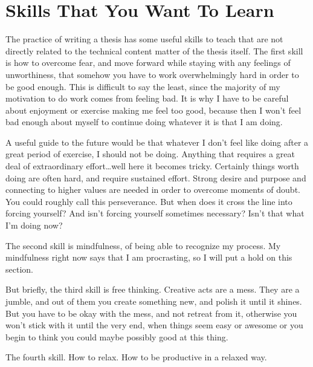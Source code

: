 \documentclass{article}
\begin{document}
\section{Skills That You Want To Learn}

The practice of writing a thesis has some useful skills to teach that are
not directly related to the technical content matter of the thesis itself.
The first skill is how to overcome fear, and move forward while staying
with any feelings of unworthiness, that somehow you have to work
overwhelmingly hard in order to be good enough. This is difficult to say
the least, since the majority of my motivation to do work comes from
feeling bad. It is why I have to be careful about enjoyment or exercise
making me feel too good, because then I won't feel bad enough about myself
to continue doing whatever it is that I am doing.

A useful guide to the future would be that whatever I don't feel like
doing after a great period of exercise, I should not be doing. Anything
that requires a great deal of extraordinary effort\ldots well here it
becomes tricky. Certainly things worth doing are often hard, and require
sustained effort. Strong desire and purpose and connecting to higher values
are needed in order to overcome moments of doubt. You could roughly
call this perseverance. But when does it cross
the line into forcing yourself? And isn't forcing yourself sometimes
necessary? Isn't that what I'm doing now?

The second skill is mindfulness, of being able to recognize my process.
My mindfulness right now says that I am procrasting, so I will put a
hold on this section.

But briefly, the third skill is free thinking. Creative acts are a mess.
They are a jumble, and out of them you create something new, and polish it
until it shines. But you have to be okay with the mess, and not retreat from
it, otherwise you won't stick with it until the very end, when things seem
easy or awesome or you begin to think you could maybe possibly good at
this thing.

The fourth skill. How to relax. How to be productive in a relaxed way.
\end{document}
